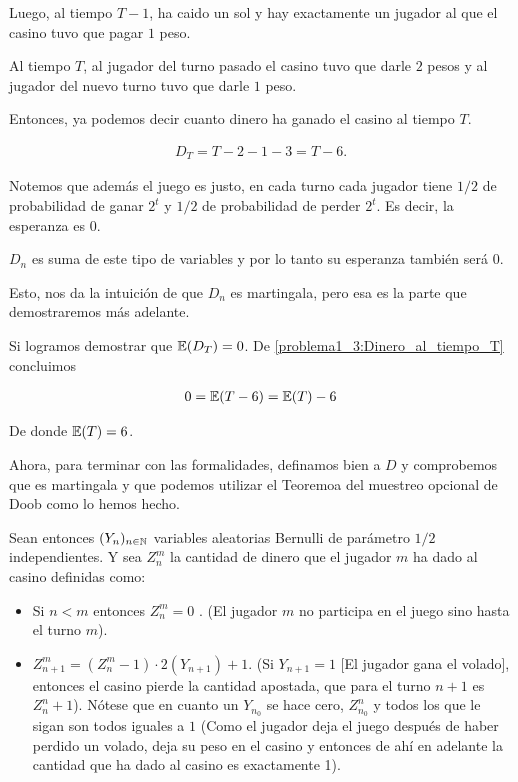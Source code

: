 	Luego, al tiempo $T-1$, ha caido un sol y hay exactamente un jugador al que el casino tuvo 
	que pagar $1$ peso.\par\null
   
	Al tiempo $T$, al jugador del turno pasado el casino tuvo que darle $2$ pesos y al jugador del nuevo
	turno tuvo que darle $1$ peso.\par\null
   
	Entonces, ya podemos decir cuanto dinero ha ganado el casino al tiempo $T$.
	
    \begin{align}\label{problema1_3:Dinero_al_tiempo_T}
		D_T = T-2 - 1 - 3 = T - 6. 
	\end{align}\par\null					   
   
	Notemos que además el juego es justo, en cada turno cada jugador tiene $1/2$ de probabilidad de
	ganar $2^t$ y $1/2$ de probabilidad de perder $2^t$. Es decir, la esperanza es $0$.\par\null
	
	$D_n$ es suma de este tipo de variables y por lo tanto su esperanza también será $0$.\par\null
   
	Esto, nos da la intuición de que $D_n$ es martingala, pero esa es la parte que demostraremos más adelante.\par\null
   
	Si logramos demostrar que $\mathbb{E}(D_T) = 0$. De \eqref{problema1_3:Dinero_al_tiempo_T} concluimos
	
    \begin{align}
		0 = \mathbb{E}(T - 6) = \mathbb{E}(T) - 6
	\end{align}
	
	De donde $\mathbb{E}(T) = 6$.\par\null
	
	Ahora, para terminar con las formalidades, definamos bien a $D$ y comprobemos que es martingala y 
	que podemos utilizar el Teoremoa del muestreo opcional de Doob como lo hemos hecho.\par\null
	
	Sean entonces $(Y_n)_{n \in \mathbb{N}}$ variables aleatorias Bernulli de parámetro $1/2$ independientes.
	Y sea $Z_n^m$ la cantidad de dinero que el jugador $m$ ha dado al casino definidas como:
	
	\begin{itemize}
		\item 
			Si $n < m$ entonces $Z_n^m = 0$ . (El jugador $m$ no participa en el juego sino hasta el turno $m$).
		\item
			$Z_{n+1}^{m} = (Z_n^{m} - 1) \cdot 2(Y_{n+1}) + 1$. (Si $Y_{n + 1} = 1$ [El jugador gana el volado], entonces el casino
			pierde la cantidad apostada, que para el turno $n+1$ es $Z_n^n + 1$). Nótese que en cuanto un $Y_{n_0}$ se hace cero,
			$Z_{n_0}^{n}$ y todos los que le sigan son todos iguales a $1$ (Como el jugador deja el juego después de haber perdido
			un volado, deja su peso en el casino y entonces de ahí en adelante la cantidad que ha dado al casino es exactamente 1).
	\end{itemize}\par\null
	
